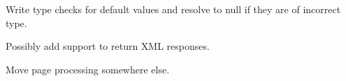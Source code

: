 \begin{DoxyRefList}
\item[\label{todo__todo000004}%
\Hypertarget{todo__todo000004}%
Class \hyperlink{class_request_data}{Request\+Data} ]Write type checks for default values and resolve to null if they are of incorrect type.  
\item[\label{todo__todo000010}%
\Hypertarget{todo__todo000010}%
Global \hyperlink{class_lora_1_1_request_handler_af59b79c7f32e254704d9388105a67bee}{Request\+Handler\+:\+:handle\+Api\+Request} (array \$action)]Possibly add support to return X\+ML responses.  
\item[\label{todo__todo000011}%
\Hypertarget{todo__todo000011}%
Global \hyperlink{class_lora_1_1_request_handler_a6fc4ced934cdeb3ef1d5a207ffb2a1e1}{Request\+Handler\+:\+:resolve\+Call} (array \$action, string \$file\+Path, string \$file\+Type, string \$namespace)]Move page processing somewhere else. 
\end{DoxyRefList}